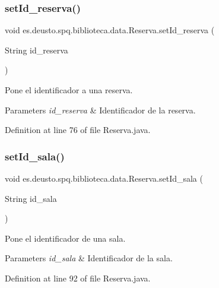\subsubsection{\texorpdfstring{set\+Id\+\_\+reserva()}{setId\_reserva()}}
{\footnotesize\ttfamily void es.\+deusto.\+spq.\+biblioteca.\+data.\+Reserva.\+set\+Id\+\_\+reserva (\begin{DoxyParamCaption}\item[{String}]{id\+\_\+reserva }\end{DoxyParamCaption})}

Pone el identificador a una reserva. 
\begin{DoxyParams}{Parameters}
{\em id\+\_\+reserva} & Identificador de la reserva. \\
\hline
\end{DoxyParams}


Definition at line 76 of file Reserva.\+java.

\mbox{\label{classes_1_1deusto_1_1spq_1_1biblioteca_1_1data_1_1_reserva_a8224d05e091bfb709d31e799c6b27368}} 
\subsubsection{\texorpdfstring{set\+Id\+\_\+sala()}{setId\_sala()}}
{\footnotesize\ttfamily void es.\+deusto.\+spq.\+biblioteca.\+data.\+Reserva.\+set\+Id\+\_\+sala (\begin{DoxyParamCaption}\item[{String}]{id\+\_\+sala }\end{DoxyParamCaption})}

Pone el identificador de una sala. 
\begin{DoxyParams}{Parameters}
{\em id\+\_\+sala} & Identificador de la sala. \\
\hline
\end{DoxyParams}


Definition at line 92 of file Reserva.\+java.

\mbox{\label{classes_1_1deusto_1_1spq_1_1biblioteca_1_1data_1_1_reserva_a249618df4bc0ad60c036a9d67267da7a}} 
